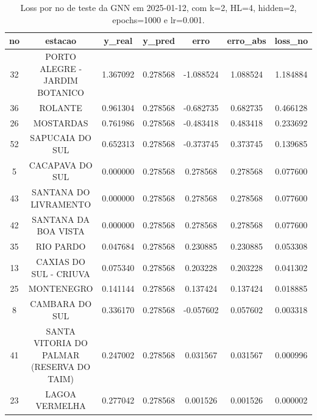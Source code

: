 \begin{table}[h]
\centering
\caption{Loss por no de teste da GNN em 2025-01-12, com k=2, HL=4, hidden=2, epochs=1000 e lr=0.001.}
\label{tab:gnn_loss_k2_hl4_h2_e1000_d20250112}
\begin{tabular}{ccccccc}
\toprule
no & estacao & y\_real & y\_pred & erro & erro\_abs & loss\_no \\
\midrule
32 & PORTO ALEGRE - JARDIM BOTANICO & 1.367092 & 0.278568 & -1.088524 & 1.088524 & 1.184884 \\
36 & ROLANTE & 0.961304 & 0.278568 & -0.682735 & 0.682735 & 0.466128 \\
26 & MOSTARDAS & 0.761986 & 0.278568 & -0.483418 & 0.483418 & 0.233692 \\
52 & SAPUCAIA DO SUL & 0.652313 & 0.278568 & -0.373745 & 0.373745 & 0.139685 \\
5 & CACAPAVA DO SUL & 0.000000 & 0.278568 & 0.278568 & 0.278568 & 0.077600 \\
43 & SANTANA DO LIVRAMENTO & 0.000000 & 0.278568 & 0.278568 & 0.278568 & 0.077600 \\
42 & SANTANA DA BOA VISTA & 0.000000 & 0.278568 & 0.278568 & 0.278568 & 0.077600 \\
35 & RIO PARDO & 0.047684 & 0.278568 & 0.230885 & 0.230885 & 0.053308 \\
13 & CAXIAS DO SUL - CRIUVA & 0.075340 & 0.278568 & 0.203228 & 0.203228 & 0.041302 \\
25 & MONTENEGRO & 0.141144 & 0.278568 & 0.137424 & 0.137424 & 0.018885 \\
8 & CAMBARA DO SUL & 0.336170 & 0.278568 & -0.057602 & 0.057602 & 0.003318 \\
41 & SANTA VITORIA DO PALMAR (RESERVA DO TAIM) & 0.247002 & 0.278568 & 0.031567 & 0.031567 & 0.000996 \\
23 & LAGOA VERMELHA & 0.277042 & 0.278568 & 0.001526 & 0.001526 & 0.000002 \\
\bottomrule
\end{tabular}
\end{table}
